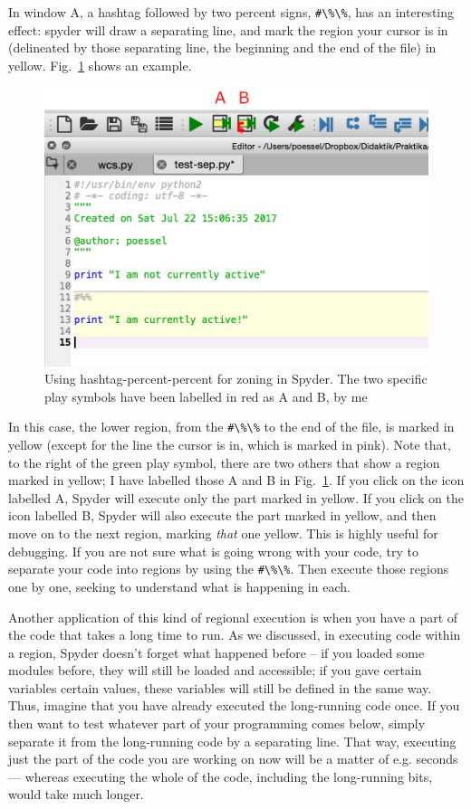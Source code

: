 \documentclass[twocolumn,apj]{openjournal}
\begin{document}
In window A, a hashtag followed by two percent signs, \verb|#\%\%|, has an interesting effect: spyder will draw a separating line, and mark the region your cursor is in (delineated by those separating line, the beginning and the end of the file) in yellow. Fig.~\ref{SpyderActiveZone} shows an example.
\begin{figure}[htbp]
\begin{center}
\includegraphics[width=\linewidth]{active-zone.jpg}
\caption{Using hashtag-percent-percent for zoning in Spyder. The two specific play symbols have been labelled in red as A and B, by me}
\label{SpyderActiveZone}
\end{center}
\end{figure}
In this case, the lower region, from the \verb|#\%\%| to the end of the file, is marked in yellow (except for the line the cursor is in, which is marked in pink). Note that,  to the right of the green play symbol, there are two others that show a region marked in yellow; I have labelled those A and B in Fig.~\ref{SpyderActiveZone}. If you click on the icon labelled A, Spyder will execute only the part marked in yellow. If you click on the icon labelled B, Spyder will also execute the part marked in yellow, and then move on to the next region, marking {\em that} one yellow. This is highly useful for debugging. If you are not sure what is going wrong with your code, try to separate your code into regions by using the \verb|#\%\%|. Then execute those regions one by one, seeking to understand what is happening in each.

Another application of this kind of regional execution is when you have a part of the code that takes a long time to run. As we discussed, in executing code within a region, Spyder doesn't forget what happened before -- if you loaded some modules before, they will still be loaded and accessible; if you gave certain variables certain values, these variables will still be defined in the same way. Thus, imagine that you have already executed the long-running code once. If you then want to test whatever part of your programming comes below, simply separate it from the long-running code by a separating line. That way, executing just the part of the code you are working on now will be a matter of e.g. seconds --- whereas executing the whole of the code, including the long-running bits, would take much longer.
\end{document}
